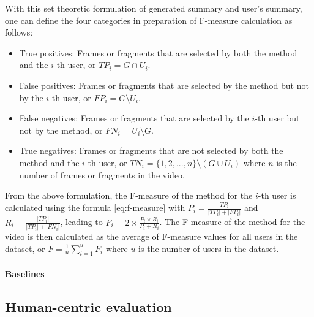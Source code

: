             With this set theoretic formulation of generated summary and user's summary, one can define the four categories in preparation of F-measure calculation as follows:

            \begin{itemize}
                \item True positives: Frames or fragments that are selected by both the method and the $i$-th user, or $TP_i = G \cap U_i$.
                \item False positives: Frames or fragments that are selected by the method but not by the $i$-th user, or $FP_i = G \setminus U_i$.
                \item False negatives: Frames or fragments that are selected by the $i$-th user but not by the method, or $FN_i = U_i \setminus G$.
                \item True negatives: Frames or fragments that are not selected by both the method and the $i$-th user, or $TN_i = \{1, 2, ..., n\} \setminus (G \cup U_i)$ where $n$ is the number of frames or fragments in the video.
            \end{itemize}

            From the above formulation, the F-measure of the method for the $i$-th user is calculated using the formula \ref{eq:f-measure} with $P_i = \frac{|TP_i|}{|TP_i| + |FP_i|}$ and $R_i = \frac{|TP_i|}{|TP_i| + |FN_i|}$, leading to $F_i = 2 \times \frac{P_i \times R_i}{P_i + R_i}$. The F-measure of the method for the video is then calculated as the average of F-measure values for all users in the dataset, or $F = \frac{1}{u} \sum_{i=1}^{u} F_i$ where $u$ is the number of users in the dataset.
            

    \paragraph[long]{Baselines}

\subsection{Human-centric evaluation}
\label{subsec:exp-evaluation-human}